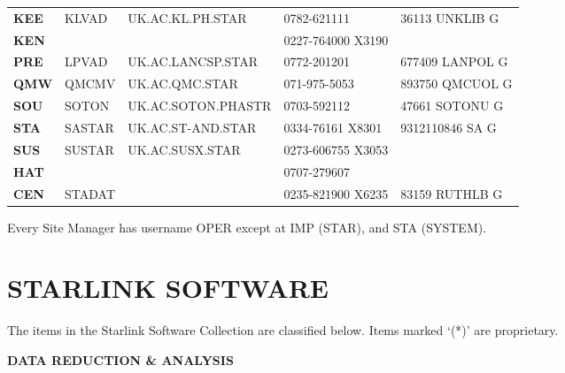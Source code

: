 \begin{center}
\begin{tabular}{||l|l|l|l|l||}
{\bf KEE} & KLVAD  & UK.AC.KL.PH.STAR  & 0782-621111 & 36113 UNKLIB G \\
{\bf KEN} &        &                   & 0227-764000 X3190 & \\
{\bf PRE} & LPVAD  & UK.AC.LANCSP.STAR & 0772-201201 & 677409 LANPOL G \\
{\bf QMW} & QMCMV  & UK.AC.QMC.STAR    & 071-975-5053 & 893750 QMCUOL G \\
{\bf SOU} & SOTON  & UK.AC.SOTON.PHASTR & 0703-592112 & 47661 SOTONU G \\
{\bf STA} & SASTAR & UK.AC.ST-AND.STAR & 0334-76161 X8301 & 9312110846 SA G \\
{\bf SUS} & SUSTAR & UK.AC.SUSX.STAR   & 0273-606755 X3053 & \\
\hline
{\bf HAT} &        &                   & 0707-279607 & \\
\hline
{\bf CEN} & STADAT &                   & 0235-821900 X6235 & 83159 RUTHLB G \\
\hline
\end{tabular}
\end{center}
Every Site Manager has username OPER except at IMP (STAR), and STA (SYSTEM).
\section {STARLINK SOFTWARE}

The items in the Starlink Software Collection are classified below.
Items marked `(*)' are proprietary.
\begin{center}
{\bf\large DATA REDUCTION \& ANALYSIS}
\end{center}

